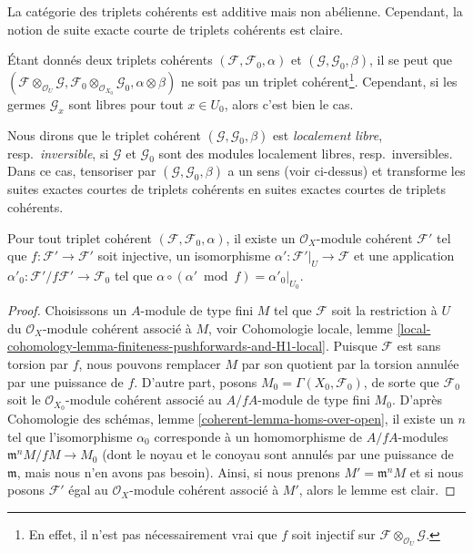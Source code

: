 \medskip\noindent
La catégorie des triplets cohérents est additive mais non abélienne.
Cependant, la notion de suite exacte courte de triplets
cohérents est claire.

\medskip\noindent
Étant donnés deux triplets cohérents $(\mathcal{F}, \mathcal{F}_0, \alpha)$
et $(\mathcal{G}, \mathcal{G}_0, \beta)$, il se peut que
$(\mathcal{F} \otimes_{\mathcal{O}_U} \mathcal{G},
\mathcal{F}_0  \otimes_{\mathcal{O}_{X_0}} \mathcal{G}_0,
\alpha \otimes \beta)$ ne soit pas un triplet cohérent\footnote{En effet, il
n'est pas nécessairement vrai que $f$
soit injectif sur $\mathcal{F} \otimes_{\mathcal{O}_U} \mathcal{G}$.}.
Cependant, si les germes $\mathcal{G}_x$ sont
libres pour tout $x \in U_0$, alors c'est bien le cas.

\medskip\noindent
Nous dirons que le triplet cohérent $(\mathcal{G}, \mathcal{G}_0, \beta)$
est {\it localement libre}, resp.\ {\it inversible},
si $\mathcal{G}$ et $\mathcal{G}_0$
sont des modules localement libres, resp.\ inversibles. Dans ce cas, tensoriser
par $(\mathcal{G}, \mathcal{G}_0, \beta)$ a un sens (voir ci-dessus)
et transforme les suites exactes courtes de triplets cohérents en suites exactes courtes
de triplets cohérents.

\begin{lemma}
\label{lemma-prepare-chi-triple}
Pour tout triplet cohérent $(\mathcal{F}, \mathcal{F}_0, \alpha)$,
il existe un $\mathcal{O}_X$-module cohérent $\mathcal{F}'$
tel que $f : \mathcal{F}' \to \mathcal{F}'$ soit injective,
un isomorphisme $\alpha' : \mathcal{F}'|_U \to \mathcal{F}$ et une application
$\alpha'_0 : \mathcal{F}'/f\mathcal{F}' \to \mathcal{F}_0$
tel que $\alpha \circ (\alpha' \bmod f) = \alpha'_0|_{U_0}$.
\end{lemma}

\begin{proof}
Choisissons un $A$-module de type fini $M$ tel que $\mathcal{F}$ soit la restriction
à $U$ du $\mathcal{O}_X$-module cohérent associé à $M$, voir
Cohomologie locale, lemme
\ref{local-cohomology-lemma-finiteness-pushforwards-and-H1-local}.
Puisque $\mathcal{F}$ est sans torsion par $f$, nous pouvons remplacer $M$ par
son quotient par la torsion annulée par une puissance de $f$.
D'autre part, posons $M_0 = \Gamma(X_0, \mathcal{F}_0)$,
de sorte que $\mathcal{F}_0$ soit le $\mathcal{O}_{X_0}$-module cohérent
associé au $A/fA$-module de type fini $M_0$.
D'après Cohomologie des schémas, lemme \ref{coherent-lemma-homs-over-open},
il existe un $n$ tel que
l'isomorphisme $\alpha_0$ corresponde à un homomorphisme de $A/fA$-modules
$\mathfrak m^n M/fM \to M_0$ (dont le noyau et le conoyau
sont annulés par une puissance de $\mathfrak m$, mais nous n'en avons pas besoin).
Ainsi, si nous prenons $M' = \mathfrak m^n M$ et si nous posons
$\mathcal{F}'$ égal au $\mathcal{O}_X$-module cohérent
associé à $M'$, alors le lemme est clair.
\end{proof}

